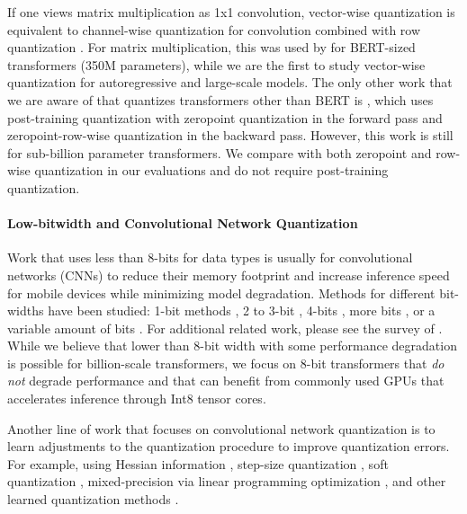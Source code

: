 \documentclass{article}
\begin{document}
If one views matrix multiplication as 1x1 convolution, vector-wise quantization is equivalent to channel-wise quantization for convolution combined with row quantization \citep{fbgemm}. For matrix multiplication, this was used by \citet{wu2020integer} for BERT-sized transformers (350M parameters), while we are the first to study vector-wise quantization for autoregressive and large-scale models.
The only other work that we are aware of that quantizes transformers other than BERT is \citet{chen2020statistical}, which uses post-training quantization with zeropoint quantization in the forward pass and zeropoint-row-wise quantization in the backward pass. However, this work is still for sub-billion parameter transformers. We compare with both zeropoint and row-wise quantization in our evaluations and do not require post-training quantization.

\paragraph{Low-bitwidth and Convolutional Network Quantization}

Work that uses less than 8-bits for data types is usually for convolutional networks (CNNs) to reduce their memory footprint and increase inference speed for mobile devices while minimizing model degradation. Methods for different bit-widths have been studied: 1-bit methods \citep{courbariaux2016bit1,Rastegari2016xnor,courbariaux2015binaryconnect}, 2 to 3-bit \citep{zhu2017ternary,choi2019bit2}, 4-bits \citep{li2019bit4}, more bits \citep{courbariaux2014training}, or a variable amount of bits \citep{gong2019softquant}. For additional related work, please see the survey of \citet{qin2020survey1bit}. While we believe that lower than 8-bit width with some performance degradation is possible for billion-scale transformers, we focus on 8-bit transformers that {\it do not} degrade performance and that can benefit from commonly used GPUs that accelerates inference through Int8 tensor cores.

Another line of work that focuses on convolutional network quantization is to learn adjustments to the quantization procedure to improve quantization errors. For example, using Hessian information \citep{dong2019hawq}, step-size quantization \citep{esser2019learned}, soft quantization \citep{gong2019softquant}, mixed-precision via linear programming optimization \citep{yao2021hawq}, and other learned quantization methods \citep{zhang2018lq, gholami2021survey}.
\end{document}
